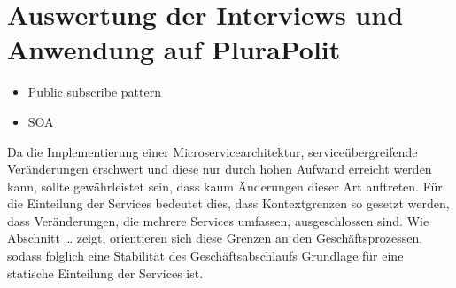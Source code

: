 \section{Auswertung der Interviews und Anwendung auf PluraPolit}
\label{sec:auswertung}

\begin{itemize}
	\item Public subscribe pattern
	\item SOA 
\end{itemize}

Da die Implementierung einer Microservicearchitektur, serviceübergreifende Veränderungen erschwert und diese nur durch hohen Aufwand erreicht werden kann, sollte gewährleistet sein, dass kaum Änderungen dieser Art auftreten. Für die Einteilung der Services bedeutet dies, dass Kontextgrenzen so gesetzt werden, dass Veränderungen, die mehrere Services umfassen, ausgeschlossen sind. Wie Abschnitt … zeigt, orientieren sich diese Grenzen an den Geschäftsprozessen, sodass folglich eine Stabilität des Geschäftsabschlaufs Grundlage für eine statische Einteilung der Services ist.